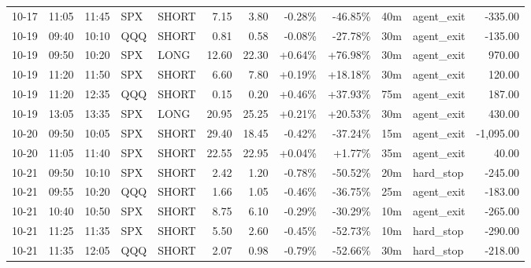 \documentclass[11pt,a4paper,twoside]{article}
\begin{document}
\begin{center}
\begin{longtable}{>{\color{txtmain}}l l l l l r r r r r >{\color{txtmain}}l r}
10-17 & 11:05 & 11:45 & SPX & SHORT & 7.15 & 3.80 & \textcolor{lossred}{-0.28\%} & \textcolor{lossred}{-46.85\%} & 40m & agent\_exit & \textcolor{lossred}{-335.00} \\
10-19 & 09:40 & 10:10 & QQQ & SHORT & 0.81 & 0.58 & \textcolor{lossred}{-0.08\%} & \textcolor{lossred}{-27.78\%} & 30m & agent\_exit & \textcolor{lossred}{-135.00} \\
10-19 & 09:50 & 10:20 & SPX & LONG & 12.60 & 22.30 & \textcolor{wingreen}{+0.64\%} & \textcolor{wingreen}{+76.98\%} & 30m & agent\_exit & \textcolor{wingreen}{970.00} \\
10-19 & 11:20 & 11:50 & SPX & SHORT & 6.60 & 7.80 & \textcolor{wingreen}{+0.19\%} & \textcolor{wingreen}{+18.18\%} & 30m & agent\_exit & \textcolor{wingreen}{120.00} \\
10-19 & 11:20 & 12:35 & QQQ & SHORT & 0.15 & 0.20 & \textcolor{wingreen}{+0.46\%} & \textcolor{wingreen}{+37.93\%} & 75m & agent\_exit & \textcolor{wingreen}{187.00} \\
10-19 & 13:05 & 13:35 & SPX & LONG & 20.95 & 25.25 & \textcolor{wingreen}{+0.21\%} & \textcolor{wingreen}{+20.53\%} & 30m & agent\_exit & \textcolor{wingreen}{430.00} \\
10-20 & 09:50 & 10:05 & SPX & SHORT & 29.40 & 18.45 & \textcolor{lossred}{-0.42\%} & \textcolor{lossred}{-37.24\%} & 15m & agent\_exit & \textcolor{lossred}{-1,095.00} \\
10-20 & 11:05 & 11:40 & SPX & SHORT & 22.55 & 22.95 & \textcolor{wingreen}{+0.04\%} & \textcolor{wingreen}{+1.77\%} & 35m & agent\_exit & \textcolor{wingreen}{40.00} \\
10-21 & 09:50 & 10:10 & SPX & SHORT & 2.42 & 1.20 & \textcolor{lossred}{-0.78\%} & \textcolor{lossred}{-50.52\%} & 20m & hard\_stop & \textcolor{lossred}{-245.00} \\
10-21 & 09:55 & 10:20 & QQQ & SHORT & 1.66 & 1.05 & \textcolor{lossred}{-0.46\%} & \textcolor{lossred}{-36.75\%} & 25m & agent\_exit & \textcolor{lossred}{-183.00} \\
10-21 & 10:40 & 10:50 & SPX & SHORT & 8.75 & 6.10 & \textcolor{lossred}{-0.29\%} & \textcolor{lossred}{-30.29\%} & 10m & agent\_exit & \textcolor{lossred}{-265.00} \\
10-21 & 11:25 & 11:35 & SPX & SHORT & 5.50 & 2.60 & \textcolor{lossred}{-0.45\%} & \textcolor{lossred}{-52.73\%} & 10m & hard\_stop & \textcolor{lossred}{-290.00} \\
10-21 & 11:35 & 12:05 & QQQ & SHORT & 2.07 & 0.98 & \textcolor{lossred}{-0.79\%} & \textcolor{lossred}{-52.66\%} & 30m & hard\_stop & \textcolor{lossred}{-218.00} \\

\end{longtable}
\end{center}
\end{document}

